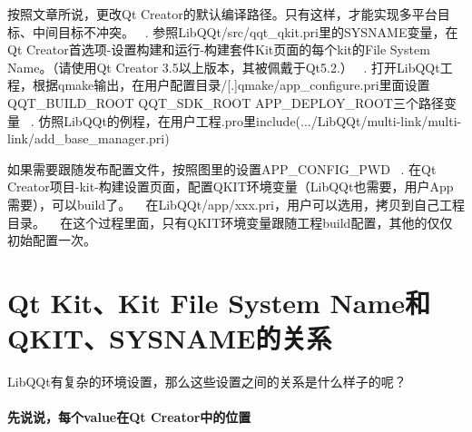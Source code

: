 \begin{DoxyEnumerate}
\item 按照文章所说，更改\+Qt Creator的默认编译路径。只有这样，才能实现多平台目标、中间目标不冲突。 ~. 参照\+Lib\+Q\+Qt/src/qqt\+\_\+qkit.pri里的\+S\+Y\+S\+N\+A\+M\+E变量，在\+Qt Creator首选项-\/设置构建和运行-\/构建套件\+Kit页面的每个kit的\+File System Name。（请使用\+Qt Creator 3.\+5以上版本，其被佩戴于\+Qt5.2.） ~. 打开\+Lib\+Q\+Qt工程，根据qmake输出，在用户配置目录/\mbox{[}.\mbox{]}qmake/app\+\_\+configure.\+pri里面设置\+Q\+Q\+T\+\_\+\+B\+U\+I\+L\+D\+\_\+\+R\+O\+OT Q\+Q\+T\+\_\+\+S\+D\+K\+\_\+\+R\+O\+OT A\+P\+P\+\_\+\+D\+E\+P\+L\+O\+Y\+\_\+\+R\+O\+O\+T三个路径变量 ~. 仿照\+Lib\+Q\+Qt的例程，在用户工程.\+pro里include(.../\+Lib\+Q\+Qt/multi-\/link/multi-\/link/add\+\_\+base\+\_\+manager.pri)
\begin{DoxyItemize}
\item 如果需要跟随发布配置文件，按照图里的设置\+A\+P\+P\+\_\+\+C\+O\+N\+F\+I\+G\+\_\+\+P\+WD ~. 在\+Qt Creator项目-\/kit-\/构建设置页面，配置\+Q\+K\+I\+T环境变量（\+Lib\+Q\+Qt也需要，用户\+App需要），可以build了。 ~\newline
 在\+Lib\+Q\+Qt/app/xxx.pri，用户可以选用，拷贝到自己工程目录。 ~\newline
在这个过程里面，只有\+Q\+K\+I\+T环境变量跟随工程build配置，其他的仅仅初始配置一次。 ~\newline
 \section*{Qt Kit、\+Kit File System Name和\+Q\+K\+I\+T、\+S\+Y\+S\+N\+A\+M\+E的关系}
\end{DoxyItemize}
\end{DoxyEnumerate}

Lib\+Q\+Qt有复杂的环境设置，那么这些设置之间的关系是什么样子的呢？ ~\newline
 \paragraph*{先说说，每个value在\+Qt Creator中的位置}


